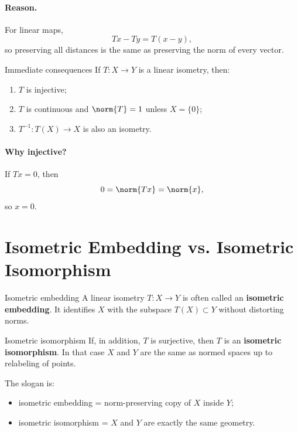 \documentclass[header={Ancillary Note: Isometries},notheorems]{study-note}
\begin{document}
\paragraph{Reason.}
For linear maps,
\[
Tx-Ty=T(x-y),
\]
so preserving all distances is the same as preserving the norm of every vector.

\begin{thmbox}{Immediate consequences}
If $T:X\to Y$ is a linear isometry, then:
\begin{enumerate}
\item $T$ is injective;
\item $T$ is continuous and $\norm{T}=1$ unless $X=\{0\}$;
\item $T^{-1}:T(X)\to X$ is also an isometry.
\end{enumerate}
\end{thmbox}

\paragraph{Why injective?}
If $Tx=0$, then
\[
0=\norm{Tx}=\norm{x},
\]
so $x=0$.

\section{Isometric Embedding vs. Isometric Isomorphism}

\begin{defbox}{Isometric embedding}
A linear isometry $T:X\to Y$ is often called an \textbf{isometric embedding}. It identifies $X$ with the subspace $T(X)\subset Y$ without distorting norms.
\end{defbox}

\begin{defbox}{Isometric isomorphism}
If, in addition, $T$ is surjective, then $T$ is an \textbf{isometric isomorphism}. In that case $X$ and $Y$ are the same as normed spaces up to relabeling of points.
\end{defbox}

\begin{focusbox}
The slogan is:
\begin{itemize}
\item isometric embedding = norm-preserving copy of $X$ inside $Y$;
\item isometric isomorphism = $X$ and $Y$ are exactly the same geometry.
\end{itemize}
\end{focusbox}
\end{document}
